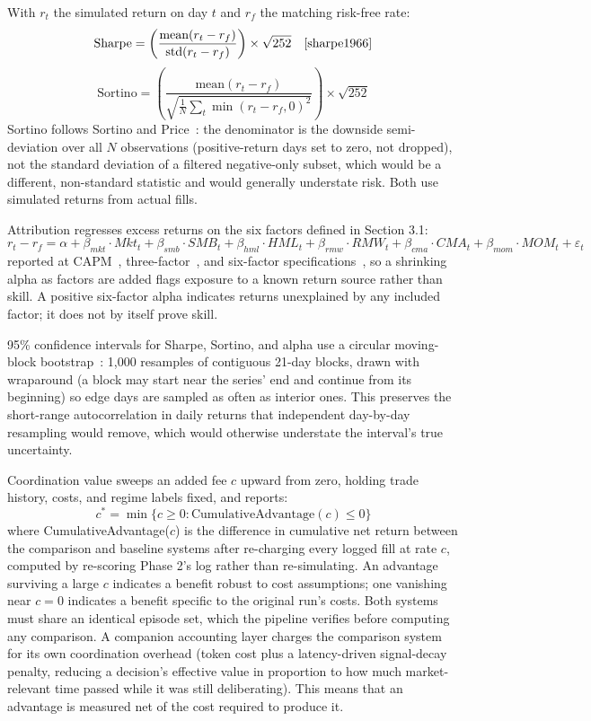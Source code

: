 \documentclass{article}
\begin{document}
With $r_t$ the simulated return on day $t$ and $r_f$ the matching risk-free rate:
\[
\text{Sharpe} = \left(\frac{\text{mean}(r_t - r_f)}{\text{std}(r_t - r_f)}\right) \times \sqrt{252} \quad \cite{sharpe1966}
\]
\[
\text{Sortino} = \left(\frac{\text{mean}(r_t - r_f)}{\sqrt{\frac{1}{N}\sum_t \min(r_t - r_f, 0)^2}}\right) \times \sqrt{252}
\]
Sortino follows Sortino and Price~\cite{sortino1994}: the denominator is the downside semi-deviation over all $N$ observations (positive-return days set to zero, not dropped), not the standard deviation of a filtered negative-only subset, which would be a different, non-standard statistic and would generally understate risk. Both use simulated returns from actual fills.

Attribution regresses excess returns on the six factors defined in Section 3.1:
\[
r_t - r_f = \alpha + \beta_{mkt}\cdot Mkt_t + \beta_{smb}\cdot SMB_t + \beta_{hml}\cdot HML_t + \beta_{rmw}\cdot RMW_t + \beta_{cma}\cdot CMA_t + \beta_{mom}\cdot MOM_t + \varepsilon_t
\]
reported at CAPM~\cite{sharpe1964}, three-factor~\cite{fama1993}, and six-factor specifications~\cite{fama2015,carhart1997}, so a shrinking alpha as factors are added flags exposure to a known return source rather than skill. A positive six-factor alpha indicates returns unexplained by any included factor; it does not by itself prove skill.

95\% confidence intervals for Sharpe, Sortino, and alpha use a circular moving-block bootstrap~\cite{politis1992,kunsch1989}: 1,000 resamples of contiguous 21-day blocks, drawn with wraparound (a block may start near the series' end and continue from its beginning) so edge days are sampled as often as interior ones. This preserves the short-range autocorrelation in daily returns that independent day-by-day resampling would remove, which would otherwise understate the interval's true uncertainty.

Coordination value sweeps an added fee $c$ upward from zero, holding trade history, costs, and regime labels fixed, and reports:
\[
c^* = \min\{c \geq 0 : \text{CumulativeAdvantage}(c) \leq 0\}
\]
where CumulativeAdvantage($c$) is the difference in cumulative net return between the comparison and baseline systems after re-charging every logged fill at rate $c$, computed by re-scoring Phase 2's log rather than re-simulating. An advantage surviving a large $c$ indicates a benefit robust to cost assumptions; one vanishing near $c = 0$ indicates a benefit specific to the original run's costs. Both systems must share an identical episode set, which the pipeline verifies before computing any comparison. A companion accounting layer charges the comparison system for its own coordination overhead (token cost plus a latency-driven signal-decay penalty, reducing a decision's effective value in proportion to how much market-relevant time passed while it was still deliberating). This means that an advantage is measured net of the cost required to produce it.
\end{document}
